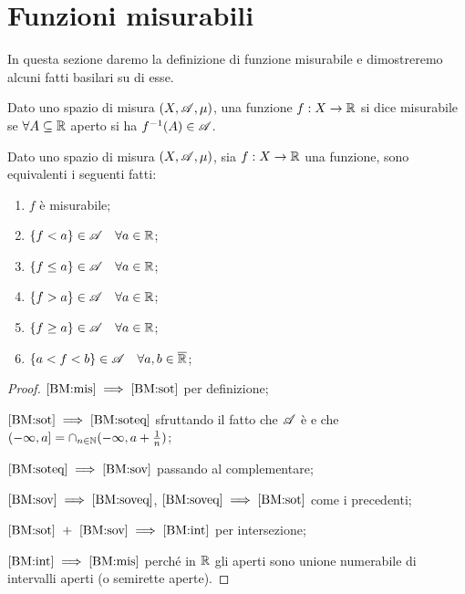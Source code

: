 \section{Funzioni misurabili}

In questa sezione daremo la definizione di funzione misurabile e dimostreremo alcuni fatti basilari su di esse.

\begin{definition}
	Dato uno spazio di misura $(X,\mathscr A,\mu)$, una funzione $f:X\rightarrow \mathbb R$ si dice misurabile se
	$\forall A \subseteq \mathbb R$ aperto si ha $f^{-1}(A)\in \mathscr A$.
\end{definition}

\begin{proposition}
	\label{BasicMis}
	Dato uno spazio di misura $(X,\mathscr A,\mu)$, sia $f:X\rightarrow \mathbb R$ una funzione, sono equivalenti i seguenti fatti:
	\begin{enumerate}[label=(\arabic*),ref=(\arabic*)]
		\item $f$ è misurabile; \label{BM:mis}
		\item $\{f<a\}\in \mathscr A \quad \forall a\in \mathbb R$; \label{BM:sot}
		\item $\{f\leq a\}\in \mathscr A \quad \forall a\in \mathbb R$; \label{BM:soteq}
		\item $\{f>a\}\in \mathscr A \quad \forall a\in \mathbb R$; \label{BM:sov}
		\item $\{f\geq a\}\in \mathscr A \quad \forall a\in \mathbb R$;  \label{BM:soveq}
		\item $\{a<f<b\}\in \mathscr A \quad \forall a,b\in \overline{\mathbb R}$; \label{BM:int}
	\end{enumerate}
\end{proposition}
\begin{proof}
	$\text{\ref{BM:mis}}\implies\text{\ref{BM:sot}}$ per definizione;
	
	$\text{\ref{BM:sot}}\implies\text{\ref{BM:soteq}}$ sfruttando il fatto che $\mathscr A$ è \sigalg{} e che
	$(-\infty,a]=\cap_{n\in \mathbb N}(-\infty,a+\frac{1}{n})$;
	
	$\text{\ref{BM:soteq}}\implies\text{\ref{BM:sov}}$ passando al complementare;
	
	$\text{\ref{BM:sov}}\implies\text{\ref{BM:soveq}}$, $\text{\ref{BM:soveq}}\implies\text{\ref{BM:sot}}$ come i precedenti;
	
	$\text{\ref{BM:sot}}\ +\ \text{\ref{BM:sov}}\implies\text{\ref{BM:int}}$ per intersezione;
	
	$\text{\ref{BM:int}}\implies\text{\ref{BM:mis}}$ perché in $\mathbb R$ gli aperti sono unione numerabile di intervalli aperti (o semirette aperte).
\end{proof}

